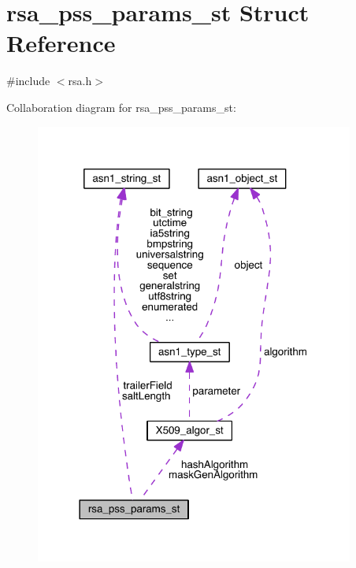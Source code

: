 \hypertarget{structrsa__pss__params__st}{}\section{rsa\+\_\+pss\+\_\+params\+\_\+st Struct Reference}
\label{structrsa__pss__params__st}


{\ttfamily \#include $<$rsa.\+h$>$}



Collaboration diagram for rsa\+\_\+pss\+\_\+params\+\_\+st\+:\nopagebreak
\begin{figure}[H]
\begin{center}
\leavevmode
\includegraphics[width=297pt]{structrsa__pss__params__st__coll__graph}
\end{center}
\end{figure}
